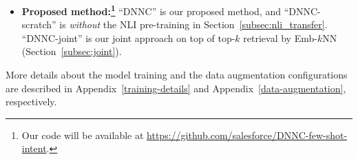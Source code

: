 \begin{itemize}
\item{\bf Proposed method:\footnote{Our code will be available at \url{https://github.com/salesforce/DNNC-few-shot-intent}.}}
``DNNC'' is our proposed method, and ``DNNC-scratch'' is {\it without} the NLI pre-training in Section~\ref{subsec:nli_transfer}.
``DNNC-joint'' is our joint approach on top of top-$k$ retrieval by Emb-$k$NN (Section~\ref{subsec:joint}).

\end{itemize}

\noindent
More details about the model training and the data augmentation configurations are described in  Appendix~\ref{training-details} and Appendix~\ref{data-augmentation}, respectively.

